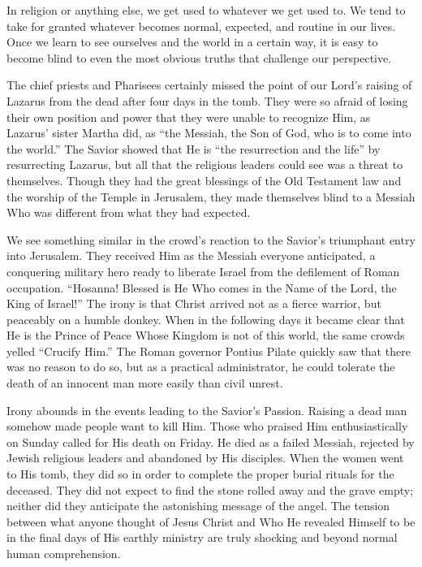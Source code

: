 \documentclass[twoside, letterpaper, 12pt]{report}
\begin{document}
\begin{maybetwocolumns}

In religion or anything else, we get used to whatever we get used to. We tend to take for granted
whatever becomes normal, expected, and routine in our lives. Once we learn to see ourselves and
the world in a certain way, it is easy to become blind to even the most obvious truths that challenge
our perspective.

The chief priests and Pharisees certainly missed the point of our Lord’s raising of Lazarus from
the dead after four days in the tomb. They were so afraid of losing their own position and power
that they were unable to recognize Him, as Lazarus’ sister Martha did, as “the Messiah, the Son of
God, who is to come into the world.” The Savior showed that He is “the resurrection and the life”
by resurrecting Lazarus, but all that the religious leaders could see was a threat to themselves.
Though they had the great blessings of the Old Testament law and the worship of the Temple in
Jerusalem, they made themselves blind to a Messiah Who was different from what they had
expected.

We see something similar in the crowd’s reaction to the Savior’s triumphant entry into Jerusalem.
They received Him as the Messiah everyone anticipated, a conquering military hero ready to
liberate Israel from the defilement of Roman occupation. “Hosanna! Blessed is He Who comes
in the Name of the Lord, the King of Israel!” The irony is that Christ arrived not as a fierce warrior,
but peaceably on a humble donkey. When in the following days it became clear that He is the
Prince of Peace Whose Kingdom is not of this world, the same crowds yelled “Crucify Him.” The
Roman governor Pontius Pilate quickly saw that there was no reason to do so, but as a practical
administrator, he could tolerate the death of an innocent man more easily than civil unrest.

Irony abounds in the events leading to the Savior’s Passion. Raising a dead man somehow made
people want to kill Him. Those who praised Him enthusiastically on Sunday called for His death
on Friday. He died as a failed Messiah, rejected by Jewish religious leaders and abandoned by His
disciples. When the women went to His tomb, they did so in order to complete the proper burial
rituals for the deceased. They did not expect to find the stone rolled away and the grave empty;
neither did they anticipate the astonishing message of the angel. The tension between what
anyone thought of Jesus Christ and Who He revealed Himself to be in the final days of His earthly
ministry are truly shocking and beyond normal human comprehension.


\end{maybetwocolumns}
\end{document}
